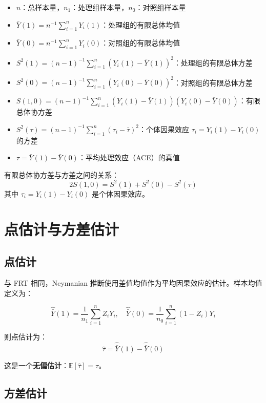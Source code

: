 \begin{itemize}
  \item $n$：总样本量，$n_1$：处理组样本量，$n_0$：对照组样本量
  \item $\bar{Y}(1) = n^{-1}\sum_{i=1}^n Y_i(1)$：处理组的有限总体均值
  \item $\bar{Y}(0) = n^{-1}\sum_{i=1}^n Y_i(0)$：对照组的有限总体均值
  \item $S^2(1) = (n-1)^{-1}\sum_{i=1}^n (Y_i(1)-\bar{Y}(1))^2$：处理组的有限总体方差
  \item $S^2(0) = (n-1)^{-1}\sum_{i=1}^n (Y_i(0)-\bar{Y}(0))^2$：对照组的有限总体方差
  \item $S(1,0) = (n-1)^{-1}\sum_{i=1}^n (Y_i(1)-\bar{Y}(1))(Y_i(0)-\bar{Y}(0))$：有限总体协方差
  \item $S^2(\tau) = (n-1)^{-1}\sum_{i=1}^n (\tau_i - \bar{\tau})^2$：个体因果效应 $\tau_i = Y_i(1)-Y_i(0)$ 的方差
  \item $\tau = \bar{Y}(1) - \bar{Y}(0)$：平均处理效应（ACE）的真值
\end{itemize}


\begin{Lemma}[Lemma 4.1]\label{lemm:4.1}
有限总体协方差与方差之间的关系：
\[
2S(1,0) = S^2(1) + S^2(0) - S^2(\tau)
\]
其中 $\tau_i = Y_i(1) - Y_i(0)$ 是个体因果效应。
\end{Lemma}

\section{点估计与方差估计}

\subsection{点估计}

与 FRT 相同，Neymanian 推断使用差值均值作为平均因果效应的估计。样本均值定义为：

\[
\hat{\bar{Y}}(1) = \frac{1}{n_1}\sum_{i=1}^n Z_i Y_i, \quad \hat{\bar{Y}}(0) = \frac{1}{n_0}\sum_{i=1}^n (1-Z_i) Y_i
\]

则点估计为：
\[
\hat{\tau} = \hat{\bar{Y}}(1) - \hat{\bar{Y}}(0)
\]

这是一个\textbf{无偏估计}：$\mathbb{E}[\hat{\tau}] = \tau$。

\subsection{方差估计}

